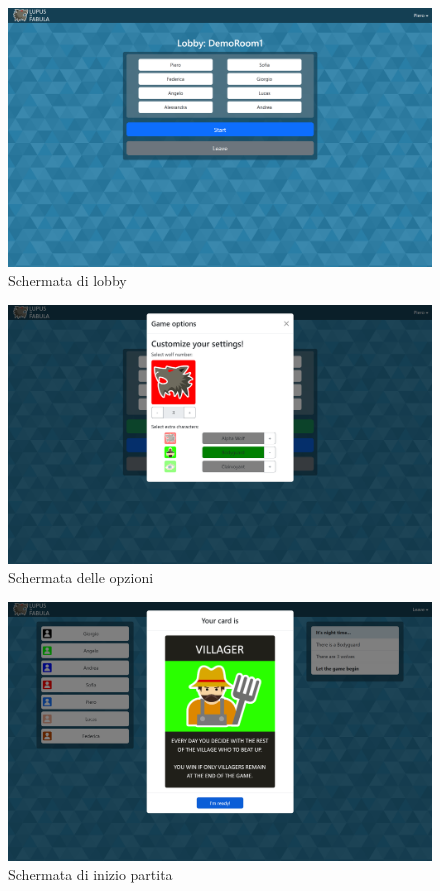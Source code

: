 \begin{figure}[H]
\centering
\includegraphics[width=\textwidth]{img/screen/desktop/lobby_desktop.png}
\caption{Schermata di lobby}
\label{fig:lobby_desktop}
\end{figure}

\begin{figure}[H]
\centering
\includegraphics[width=\textwidth]{img/screen/desktop/option_desktop.png}
\caption{Schermata delle opzioni}
\label{fig:option_desktop}
\end{figure}

\begin{figure}[H]
\centering
\includegraphics[width=\textwidth]{img/screen/desktop/card_desktop.png}
\caption{Schermata di inizio partita}
\label{fig:card_desktop}
\end{figure}

